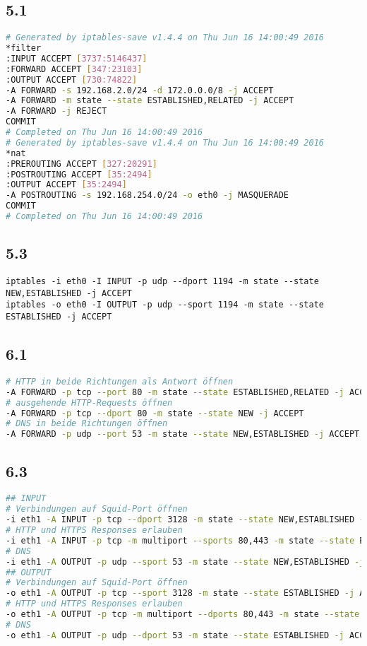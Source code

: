 \documentclass[twoside]{article}
\begin{document}
	\subsection*{5.1}
	\label{a5-1}
	\begin{lstlisting}[language=bash]
# Generated by iptables-save v1.4.4 on Thu Jun 16 14:00:49 2016
*filter
:INPUT ACCEPT [3737:5146437]
:FORWARD ACCEPT [347:23103]
:OUTPUT ACCEPT [730:74822]
-A FORWARD -s 192.168.2.0/24 -d 172.0.0.0/8 -j ACCEPT
-A FORWARD -m state --state ESTABLISHED,RELATED -j ACCEPT
-A FORWARD -j REJECT
COMMIT
# Completed on Thu Jun 16 14:00:49 2016
# Generated by iptables-save v1.4.4 on Thu Jun 16 14:00:49 2016
*nat
:PREROUTING ACCEPT [327:20291]
:POSTROUTING ACCEPT [35:2494]
:OUTPUT ACCEPT [35:2494]
-A POSTROUTING -s 192.168.254.0/24 -o eth0 -j MASQUERADE 
COMMIT
# Completed on Thu Jun 16 14:00:49 2016
	\end{lstlisting}
	\subsection*{5.3}
	\label{a5-3}
	\begin{lstlisting}
iptables -i eth0 -I INPUT -p udp --dport 1194 -m state --state NEW,ESTABLISHED -j ACCEPT
iptables -o eth0 -I OUTPUT -p udp --sport 1194 -m state --state ESTABLISHED -j ACCEPT
	\end{lstlisting}
	\subsection*{6.1}
	\label{a6-1}
	\begin{lstlisting}[language=bash]
# HTTP in beide Richtungen als Antwort öffnen
-A FORWARD -p tcp --port 80 -m state --state ESTABLISHED,RELATED -j ACCEPT
# ausgehende HTTP-Requests öffnen
-A FORWARD -p tcp --dport 80 -m state --state NEW -j ACCEPT
# DNS in beide Richtungen öffnen
-A FORWARD -p udp --port 53 -m state --state NEW,ESTABLISHED -j ACCEPT
	\end{lstlisting}
	\subsection*{6.3}
	\label{a6-3}
	\begin{lstlisting}[language=bash]
## INPUT
# Verbindungen auf Squid-Port öffnen
-i eth1 -A INPUT -p tcp --dport 3128 -m state --state NEW,ESTABLISHED -j ACCEPT
# HTTP und HTTPS Responses erlauben
-i eth1 -A INPUT -p tcp -m multiport --sports 80,443 -m state --state ESTABLISHED -j ACCEPT
# DNS
-i eth1 -A OUTPUT -p udp --sport 53 -m state --state NEW,ESTABLISHED -j ACCEPT
## OUTPUT
# Verbindungen auf Squid-Port öffnen
-o eth1 -A OUTPUT -p tcp --sport 3128 -m state --state ESTABLISHED -j ACCEPT
# HTTP und HTTPS Responses erlauben
-o eth1 -A OUTPUT -p tcp -m multiport --dports 80,443 -m state --state ESTABLISHED -j ACCEPT
# DNS
-o eth1 -A OUTPUT -p udp --dport 53 -m state --state ESTABLISHED -j ACCEPT
	\end{lstlisting}
\end{document}
